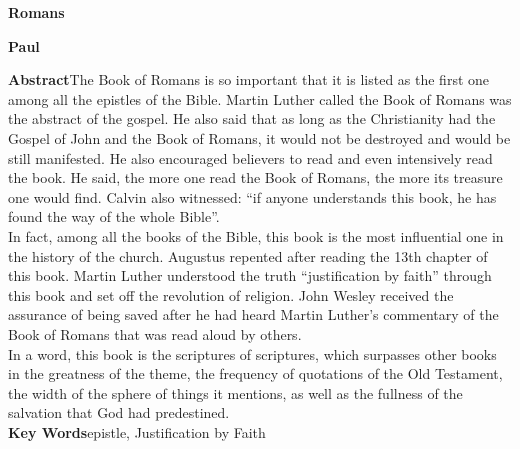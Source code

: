 \documentclass[a4paper,11pt,onecolumn,twoside]{ctexart}
\begin{document}
\vspace{.1cm}
\begin{center}
	\parbox{\textwidth}{{\large{\textbf{Romans}}}\\
	\vspace{-0.5cm}
	\begin{center}
		\textbf{Paul}\\[2pt]
	\end{center}
	{\small{\textbf{Abstract}\quad The Book of Romans is so important that it is listed as the first one among all the epistles of the Bible. Martin Luther called the Book of Romans was the abstract of the gospel. He also said that as long as the Christianity had the Gospel of John and the Book of Romans, it would not be destroyed and would be still manifested. He also encouraged believers to read and even intensively read the book. He said, the more one read the Book of Romans, the more its treasure one would find. Calvin also witnessed: “if anyone understands this book, he has found the way of the whole Bible”.\\
			In fact, among all the books of the Bible, this book is the most influential one in the history of the church. Augustus repented after reading the 13th chapter of this book. Martin Luther understood the truth “justification by faith” through this book and set off the revolution of religion. John Wesley received the assurance of being saved after he had heard Martin Luther’s commentary of the Book of Romans that was read aloud by others.\\
			In a word, this book is the scriptures of scriptures, which surpasses other books in the greatness of the theme, the frequency of quotations of the Old Testament, the width of the sphere of things it mentions, as well as the fullness of the salvation that God had predestined.\\
	\textbf{Key Words}\quad epistle, Justification by Faith}}
	}
\end{center}
\setlength{\oddsidemargin}{-.5cm}  %
\setlength{\evensidemargin}{\oddsidemargin}
\setlength{\textwidth}{17.00cm}
\end{document}

